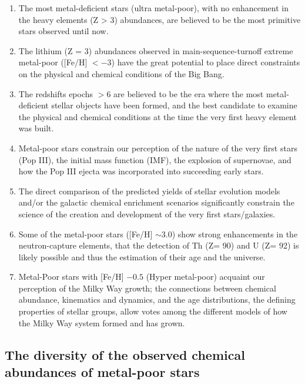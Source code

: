 \begin{enumerate}
  \item The most metal-deficient stars (ultra metal-poor), with no enhancement in the heavy elements (Z > 3) abundances, are believed to be the most primitive stars observed until now.
  \item The lithium (Z = 3) abundances observed in main-sequence-turnoff extreme metal-poor ([Fe/H] $<-$3) have the great potential to place direct constraints on the physical and chemical conditions of the Big Bang.
  \item The redshifts epochs $> 6$ are believed to be the era where the most metal-deficient stellar objects have been formed, and the best candidate to examine the physical and chemical conditions at the time the very first heavy element was built. 
  \item Metal-poor stars constrain our perception of the nature of the very first stars (Pop III), the initial mass function (IMF), the explosion of supernovae, and how the Pop III ejecta was incorporated into succeeding early stars.
  \item The direct comparison of the predicted yields of stellar evolution models and/or the galactic chemical enrichment scenarios significantly constrain the science of the creation and development of the very first stars/galaxies.
  \item Some of the metal-poor stars ([Fe/H] $\sim 3.0$) show strong enhancements in the neutron-capture elements, that the detection of Th (Z= 90) and U (Z= 92)  is likely possible and thus the estimation of their age and the universe. 
  \item Metal-Poor stars with [Fe/H] $-0.5$ (Hyper metal-poor) acquaint our perception of the Milky Way growth; the connections between chemical abundance, kinematics and dynamics, and the age distributions, the defining properties of stellar groups,  allow votes among the different models of how the Milky Way system formed and has grown.
\end{enumerate}


\subsection{The diversity of the observed chemical abundances of metal-poor stars}

